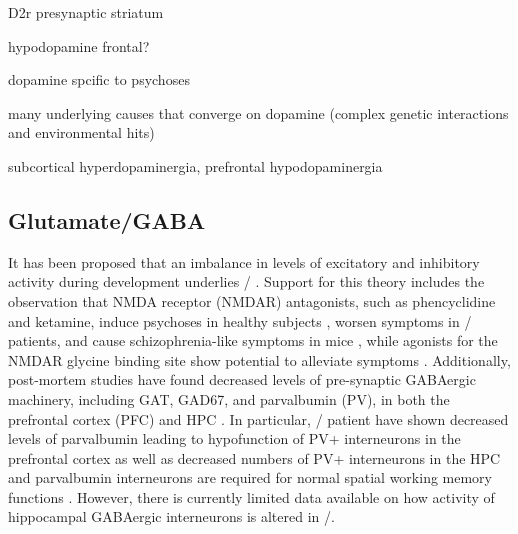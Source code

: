 D2r presynaptic striatum

hypodopamine frontal?

dopamine spcific to psychoses

many underlying causes that converge on dopamine (complex genetic interactions and environmental hits)

subcortical hyperdopaminergia, prefrontal hypodopaminergia

\subsection{Glutamate/GABA}\label{sec:intro:scz:glutamate}
It has been proposed that an imbalance in levels of excitatory and inhibitory activity during development underlies \scz/ \citep{Insel2010, Coyle2006, Yizhar2011}.
Support for this theory includes the observation that NMDA receptor (NMDAR) antagonists, such as phencyclidine and ketamine, induce psychoses in healthy subjects \citep{Morris2005}, worsen symptoms in \scz/ patients, and cause schizophrenia-like symptoms in mice \citep{Inta2010}, while agonists for the NMDAR glycine binding site show potential to alleviate symptoms \citep{Tsai1998}.
Additionally, post-mortem studies have found decreased levels of pre-synaptic GABAergic machinery, including GAT, GAD67, and parvalbumin (PV), in both the prefrontal cortex (PFC) and HPC \citep{Coyle2006, Zhang2002, Konradi2011}.
In particular, \scz/ patient have shown decreased levels of parvalbumin leading to hypofunction of PV+ interneurons in the prefrontal cortex as well as decreased numbers of PV+ interneurons in the HPC \citep{Zhang2002, Lewis2005} and parvalbumin interneurons are required for normal spatial working memory functions \citep{Korotkova2010, Murray2011}.
However, there is currently limited data available on how activity of hippocampal GABAergic interneurons is altered in \scz/.
